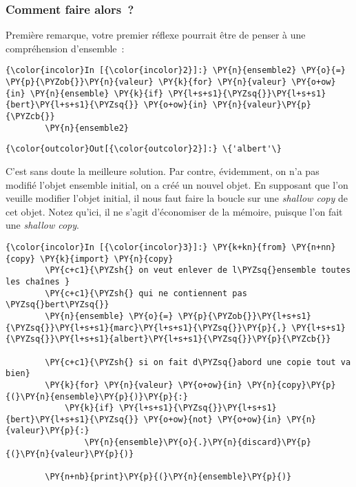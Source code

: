     \hypertarget{comment-faire-alors}{%
\subsubsection{Comment faire alors~?}\label{comment-faire-alors}}

    Première remarque, votre premier réflexe pourrait être de penser à une
compréhension d'ensemble~:

    \begin{Verbatim}[commandchars=\\\{\}]
{\color{incolor}In [{\color{incolor}2}]:} \PY{n}{ensemble2} \PY{o}{=} \PY{p}{\PYZob{}}\PY{n}{valeur} \PY{k}{for} \PY{n}{valeur} \PY{o+ow}{in} \PY{n}{ensemble} \PY{k}{if} \PY{l+s+s1}{\PYZsq{}}\PY{l+s+s1}{bert}\PY{l+s+s1}{\PYZsq{}} \PY{o+ow}{in} \PY{n}{valeur}\PY{p}{\PYZcb{}}
        \PY{n}{ensemble2}
\end{Verbatim}


\begin{Verbatim}[commandchars=\\\{\}]
{\color{outcolor}Out[{\color{outcolor}2}]:} \{'albert'\}
\end{Verbatim}
            
    C'est sans doute la meilleure solution. Par contre, évidemment, on n'a
pas modifié l'objet ensemble initial, on a créé un nouvel objet. En
supposant que l'on veuille modifier l'objet initial, il nous faut faire
la boucle sur une \emph{shallow copy} de cet objet. Notez qu'ici, il ne
s'agit d'économiser de la mémoire, puisque l'on fait une \emph{shallow
copy}.

    \begin{Verbatim}[commandchars=\\\{\}]
{\color{incolor}In [{\color{incolor}3}]:} \PY{k+kn}{from} \PY{n+nn}{copy} \PY{k}{import} \PY{n}{copy}
        \PY{c+c1}{\PYZsh{} on veut enlever de l\PYZsq{}ensemble toutes les chaînes }
        \PY{c+c1}{\PYZsh{} qui ne contiennent pas \PYZsq{}bert\PYZsq{}}
        \PY{n}{ensemble} \PY{o}{=} \PY{p}{\PYZob{}}\PY{l+s+s1}{\PYZsq{}}\PY{l+s+s1}{marc}\PY{l+s+s1}{\PYZsq{}}\PY{p}{,} \PY{l+s+s1}{\PYZsq{}}\PY{l+s+s1}{albert}\PY{l+s+s1}{\PYZsq{}}\PY{p}{\PYZcb{}}
        
        \PY{c+c1}{\PYZsh{} si on fait d\PYZsq{}abord une copie tout va bien}
        \PY{k}{for} \PY{n}{valeur} \PY{o+ow}{in} \PY{n}{copy}\PY{p}{(}\PY{n}{ensemble}\PY{p}{)}\PY{p}{:}
            \PY{k}{if} \PY{l+s+s1}{\PYZsq{}}\PY{l+s+s1}{bert}\PY{l+s+s1}{\PYZsq{}} \PY{o+ow}{not} \PY{o+ow}{in} \PY{n}{valeur}\PY{p}{:}
                \PY{n}{ensemble}\PY{o}{.}\PY{n}{discard}\PY{p}{(}\PY{n}{valeur}\PY{p}{)}
                
        \PY{n+nb}{print}\PY{p}{(}\PY{n}{ensemble}\PY{p}{)}
\end{Verbatim}


